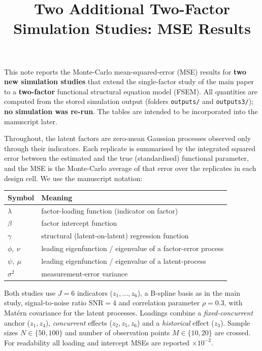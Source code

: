 \documentclass[11pt]{article}
\title{Two Additional Two-Factor Simulation Studies: MSE Results}
\author{}
\date{}
\begin{document}
\maketitle

This note reports the Monte-Carlo mean-squared-error (MSE) results for \textbf{two
new simulation studies} that extend the single-factor study of the main paper to a
\textbf{two-factor} functional structural equation model (FSEM). All quantities are
computed from the stored simulation output (folders \texttt{outputs/} and
\texttt{outputs3/}); \textbf{no simulation was re-run}. The tables are intended to be
incorporated into the manuscript later.

Throughout, the latent factors are zero-mean Gaussian processes observed only
through their indicators. Each replicate is summarised by the integrated squared
error between the estimated and the true (standardised) functional parameter, and
the MSE is the Monte-Carlo average of that error over the replicates in each
design cell. We use the manuscript notation:

\begin{center}
\begin{tabular}{ll}
\toprule
Symbol & Meaning \\
\midrule
$\lambda$ & factor-loading function (indicator on factor) \\
$\beta$ & factor intercept function \\
$\gamma$ & structural (latent-on-latent) regression function \\
$\phi,\ \nu$ & leading eigenfunction / eigenvalue of a factor-error process \\
$\psi,\ \mu$ & leading eigenfunction / eigenvalue of a latent-process \\
$\sigma^2$ & measurement-error variance \\
\bottomrule
\end{tabular}
\end{center}

Both studies use $J=6$ indicators ($z_1,\dots,z_6$), a B-spline basis as in the
main study, signal-to-noise ratio $\mathrm{SNR}=4$ and correlation parameter
$\rho=0.3$, with Mat\'ern covariance for the latent processes. Loadings combine a
\emph{fixed-concurrent} anchor ($z_1,z_4$), \emph{concurrent} effects
($z_2,z_5,z_6$) and a \emph{historical} effect ($z_3$). Sample sizes
$N\in\{50,100\}$ and number of observation points $M\in\{10,20\}$ are crossed. For
readability all loading and intercept MSEs are reported $\times 10^{-2}$.
\end{document}

